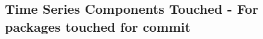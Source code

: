 \subsection{Time Series Components Touched - \label{subsec:codebase_graph_latex.repository_graph.component_time_series.time_series_components_touched_packages_commit} 
For packages touched for commit} 




\clearpage
